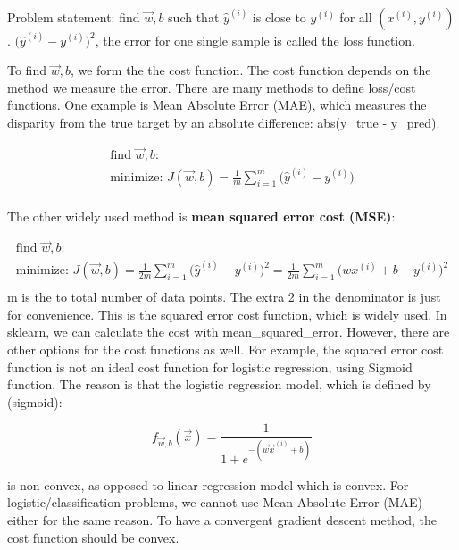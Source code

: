 \documentclass[12pt]{report}
\begin{document}
Problem statement: find $\overrightarrow{w},b$ such that $\hat{y}^{(i)}$ is close to $y^{(i)}$ for all $(x^{(i)}, y^{(i)} )$. $\big(\hat{y}^{(i)}  - y^{(i)} \big) ^2$, the error for one single sample is called the loss function.

To find $\overrightarrow{w},b$, we form the the cost function. The cost function depends on the method we measure the error. There are many methods to define loss/cost functions. One example is Mean Absolute Error (MAE), which measures the disparity from the true target by an absolute difference: abs(y\_true - y\_pred).

\begin{multline}
  \text{find $\overrightarrow{w},b$:} \\
  \text{minimize:  }  J(\overrightarrow{w},b) = \frac{1}{m} \sum_{i=1}^{m} \big(\hat{y}^{(i)}  - y^{(i)} \big) \\
\end{multline}


The other widely used method is \textbf{mean squared error cost (MSE)}:

\begin{multline}
	\text{find $\overrightarrow{w},b$:} \\
	\text{minimize:  }  J(\overrightarrow{w},b) = \frac{1}{2m} \sum_{i=1}^{m} \big(\hat{y}^{(i)}  - y^{(i)} \big) ^2 = \frac{1}{2m} \sum_{i=1}^{m} \big( wx ^ {(i)} + b - y^{(i)} \big) ^2 \\
\end{multline}
m is the to total number of data points. The extra 2 in the denominator is just for convenience. This is the squared error cost function, which is widely used. In sklearn, we can calculate the cost with mean\_squared\_error. However, there are other options for the cost functions as well. For example, the squared error cost function is not an ideal cost function for logistic regression, using Sigmoid function. The reason is that the logistic regression model, which is defined by (sigmoid):

\begin{equation}
  f_{\overrightarrow{w},b} (\overrightarrow{x}) = \frac{1}{1+e^{-(\overrightarrow{w} \overrightarrow{x} ^ {(i)} + b)}}
\end{equation}

is non-convex, as opposed to linear regression model which is convex. For logistic/classification problems, we cannot use Mean Absolute Error (MAE) either for the same reason. To have a convergent gradient descent method, the cost function should be convex.
\end{document}
